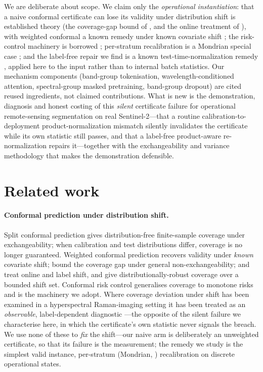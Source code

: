 \documentclass[preprint,3p,times]{elsarticle}
\begin{document}
We are deliberate about scope. We claim only the \emph{operational instantiation}: that a naive conformal certificate can lose its validity under distribution shift is established theory (the coverage-gap bound of \citet{barber2023}, and the online treatment of \citet{gibbs2021}), with weighted conformal a known remedy under known covariate shift \citep{tibshirani2019}; the risk-control machinery is borrowed \citep{angelopoulos2024}; per-stratum recalibration is a Mondrian special case \citep{vovk2005}; and the label-free repair we find is a known test-time-normalization remedy \citep{schneider2020,tent2021,dua2022,corley2024}, applied here to the input rather than to internal batch statistics. Our mechanism components (band-group tokenisation, wavelength-conditioned attention, spectral-group masked pretraining, band-group dropout) are cited reused ingredients, not claimed contributions. What is new is the demonstration, diagnosis and honest costing of this \emph{silent} certificate failure for operational remote-sensing segmentation on real Sentinel-2---that a routine calibration-to-deployment product-normalization mismatch silently invalidates the certificate while its own statistic still passes, and that a label-free product-aware re-normalization repairs it---together with the exchangeability and variance methodology that makes the demonstration defensible.

\section{Related work}
\paragraph{Conformal prediction under distribution shift.} Split conformal prediction gives distribution-free finite-sample coverage under exchangeability; when calibration and test distributions differ, coverage is no longer guaranteed. Weighted conformal prediction \citep{tibshirani2019} recovers validity under \emph{known} covariate shift; \citet{barber2023} bound the coverage gap under general non-exchangeability; \citet{gibbs2021} and \citet{podkopaev2021} treat online and label shift, and \citet{cauchois2024} give distributionally-robust coverage over a bounded shift set. Conformal risk control \citep{angelopoulos2024} generalises coverage to monotone risks and is the machinery we adopt. Where coverage deviation under shift has been examined in a hyperspectral Raman-imaging setting it has been treated as an \emph{observable}, label-dependent diagnostic \citep{booksh2025}---the opposite of the silent failure we characterise here, in which the certificate's own statistic never signals the breach. We use none of these to \emph{fix} the shift---our naive arm is deliberately an unweighted certificate, so that its failure is the measurement; the remedy we study is the simplest valid instance, per-stratum (Mondrian, \citealt{vovk2005}) recalibration on discrete operational states.
\end{document}
